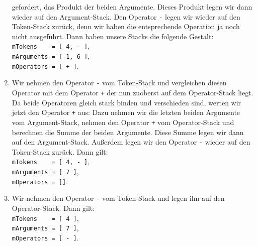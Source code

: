 \begin{enumerate}
      gefordert, das Produkt der beiden Argumente. Dieses Produkt legen wir dann wieder auf
      den Argument-Stack.  Den Operator \texttt{-} legen wir wieder
      auf den Token-Stack zur\"uck, denn wir haben die entsprechende Operation ja noch nicht
      ausgef\"uhrt.   
      Dann haben unsere Stacks die folgende Gestalt: \\[0.1cm]
      \hspace*{1.3cm} \texttt{mTokens \ \ \ = [ 4, - ]}, \\[0.1cm]
      \hspace*{1.3cm} \texttt{mArguments = [ 1, 6 ]}, \\[0.1cm]
      \hspace*{1.3cm} \texttt{mOperators = [ + ]}. 
\item Wir nehmen den Operator \texttt{-} vom Token-Stack und
      vergleichen diesen Operator mit dem Operator \texttt{+} der nun zuoberst auf dem Operator-Stack liegt.
      Da beide Operatoren gleich stark binden und verschieden sind, werten wir jetzt den Operator
      \texttt{+} aus:  Dazu nehmen wir die letzten beiden Argumente vom Argument-Stack, nehmen den Operator
      \texttt{+} vom Operator-Stack und berechnen die Summe der beiden Argumente.
      Diese Summe legen wir dann auf den Argument-Stack.  Au{\ss}erdem legen wir den Operator
      \texttt{-} wieder auf den Token-Stack zur\"uck.      
      Dann gilt: \\[0.1cm]
      \hspace*{1.3cm} \texttt{mTokens \ \ \ = [ 4, - ]}, \\[0.1cm]
      \hspace*{1.3cm} \texttt{mArguments = [ 7 ]}, \\[0.1cm]
      \hspace*{1.3cm} \texttt{mOperators = []}. 
\item Wir nehmen  den Operator \texttt{-} vom Token-Stack und legen
      ihn auf den Operator-Stack.
      Dann gilt: \\[0.1cm]
      \hspace*{1.3cm} \texttt{mTokens \ \ \ = [ 4 ]}, \\[0.1cm]
      \hspace*{1.3cm} \texttt{mArguments = [ 7 ]}, \\[0.1cm]
      \hspace*{1.3cm} \texttt{mOperators = [ - ]}. 

\end{enumerate}
